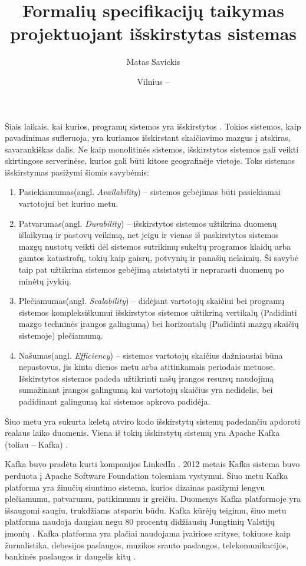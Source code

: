 \documentclass{VUMIFPSmagistrinis}
\title{Formalių specifikacijų taikymas projektuojant išskirstytas sistemas}
\author{Matas Savickis}
\date{Vilnius – \the\year}
\begin{document}
\maketitle

\tableofcontents


		Šiais laikais, kai kurios, programų sistemos yra išskirstytos \cite{mcr}. 
		Tokios sistemos, kaip pavadinimas sufleruoja, yra kuriamos išskirstant skaičiavimo mazgus į atskiras, savarankiškas dalis.
		Ne kaip monolitinės sistemos, išskirstytos sistemos gali veikti skirtingose serverinėse, kurios gali būti kitose geografinėje vietoje.
		Toks sistemos išskirstymas pasižymi šiomis savybėmis:
		\begin{enumerate}
			\item{Pasiekiamumas(angl. {\it Availability}) -- sistemos gebėjimas būti pasiekiamai vartotojui bet kuriuo metu.}
			\item{Patvarumas(angl. {\it Durability}) -- išskirstytos sistemos užtikrina duomenų išlaikymą ir pastovų veikimą, net jeigu ir vienas iš paskirstytos sistemos mazgų nustotų veikti dėl sistemos sutrikimų sukeltų programos klaidų arba gamtos katastrofų, tokių kaip gaisrų, potvynių ir panašių nelaimių. Ši savybė taip pat užtikrina sistemos gebėjimą atsistatyti ir neprarasti duomenų po minėtų įvykių.}
			\item{Plečiamumas(angl. {\it Scalability}) -- didėjant vartotojų skaičiui bei programų sistemos kompleksiškumui išskirstytos sistemos užtikriną vertikalų (Padidinti mazgo techninės įrangos galingumą) bei horizontalų (Padidinti mazgų skaičių sistemoje) plečiamumą.}
			\item{Našumas(angl. {\it Efficiency}) -- sistemos vartotojų skaičius dažniausiai būna nepastovus, jis kinta dienos metu arba atitinkamais periodais metuose. Išskirstytos sistemos padeda užtikrinti našų įrangos resursų naudojimą sumažinant įrangos galingumą kai vartotojų skaičius yra nedidelis, bei padidinant galingumą kai sistemos apkrova padidėja.}
		\end{enumerate}
		Šiuo metu yra sukurta keletą atviro kodo išskirstytų sistemų padedančiu apdoroti realaus laiko duomenis.	
		Viena iš tokių išskirstytų sistemų yra Apache Kafka (toliau -- Kafka) \cite{kfk}.


 		Kafka buvo pradėta kurti kompanijos LinkedIn \cite{kfk}.
		2012 metais Kafka sistema buvo perduota į Apache Software Foundation tolesniam vystymui.
		Šiuo metu Kafka platforma yra žinučių siuntimo sistema, kurios dizainas pasižymi lengvu plečiamumu, patvarumu, patikimumu ir greičiu.
		Duomenys Kafka platformoje yra išsaugomi saugiu, trukdžiams atspariu būdu.
		Kafka kūrėjų teigimu, šiuo metu platforma naudoja daugiau negu 80 procentų didžiausių Jungtinių Valstijų įmonių \cite{kfk}.
		Kafka platforma yra plačiai naudojama įvairiose srityse, tokiuose kaip žurnalistika, debesijos paslaugos, muzikos srauto paslaugos, telekomunikacijos, bankinės paslaugos ir daugelis kitų \cite{kfk}.
\end{document}
